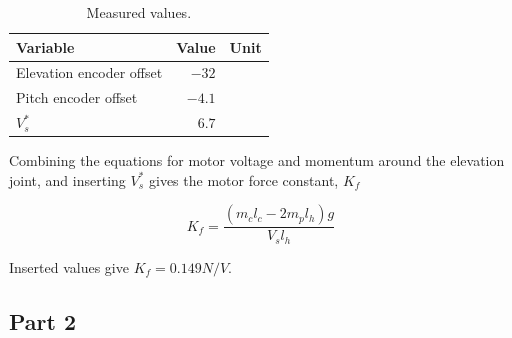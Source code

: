 \begin{table}[h!]
	\centering
	\caption{Measured values.}
	\begin{tabular}{lrl}
		\toprule
		Variable & Value & Unit\\
		\midrule
	    Elevation encoder offset   & $-32$ & \degree  \\
		Pitch encoder offset & $-4.1$      & \degree  \\
		$V_s^\ast$   &  $\; 6.7$           & \volt    \\
		\bottomrule
	\end{tabular}
\label{tab:offsets}
\end{table}

Combining the equations for motor voltage and momentum around the elevation joint, and inserting $V_s^\ast$ gives the motor force constant, $K_f$

\begin{equation}
    K_f = \frac{(m_c l_c - 2 m_p l_h)g}{V_s l_h}
\end{equation}

Inserted values give $K_f = 0.149N/V$.

\subsection{Part 2}


